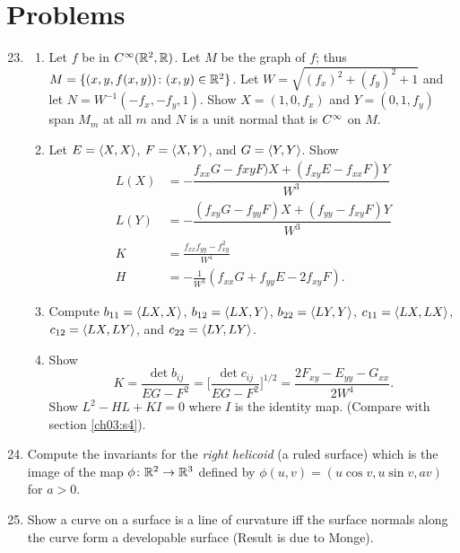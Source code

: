 \documentclass[../main]{subfiles}
\begin{document}
\section*{Problems}

\begin{enumerate}
    \setcounter{enumi}{22}
    \item\label{pro:23} 
    \begin{enumerate}[label = (\roman*)]
        \item Let $f$ be in $C^\infty(\mathbb{R}^2, \mathbb{R})$. Let $M$ be the graph of $f$; thus \\ $M = \{(x,y,f(x,y)) \colon (x,y) \in \mathbb{R}^2\}$. Let $W = \sqrt{(f_x)^2 + (f_y)^2 + 1}$ and let $N = W^{-1}(-f_x, -f_y, 1)$. Show $X = (1, 0, f_x)$ and $Y = (0, 1, f_y)$ span $M_m$ at all $m$ and $N$ is a unit normal that is $C^\infty$ on $M$.
        \item Let $E = \left\langle X,X\right\rangle$, $F=\left\langle X,Y\right\rangle$, and $G = \left\langle Y,Y\right\rangle$. Show
    \[ 
    \begin{aligned}
    L(X) &= -\dfrac{f_{xx}G-f{xy}F)X + (f_{xy}E - f_{xx}F)Y}{W^3}\\
    L(Y) &= -\dfrac{(f_{xy}G-f_{yy}F)X+(f_{yy}-f_{xy}F)Y}{W^3}\\
    K &= \frac{f_{xx}f_{yy} - f_{xy}^2}{W^4}\\
    H &= -\frac{1}{W^3} (f_{xx}G + f_{yy}E - 2f_{xy}F).
    \end{aligned}
    \]
        \item Compute $b_{11} = \left\langle LX,X\right\rangle$, $b_{12}=\left\langle LX,Y\right\rangle$, $b_{22} = \left\langle LY,Y\right\rangle$, $c_{11}=\left\langle LX,LX\right\rangle$, $c_{12}=\left\langle LX,LY\right\rangle$, and $c_{22}=\left\langle LY,LY\right\rangle$.
        \item  Show \[K = \dfrac{\det b_{ij}}{EG-F^2} = \bigg[\dfrac{\det c_{ij}}{EG-F^2}\bigg]^{1/2} = \dfrac{2F_{xy} -E_{yy} - G_{xx}}{2W^4}.\]Show $L^2 - HL + KI = 0$ where $I$ is the identity map. (Compare with section \ref{ch03:s4}). 
    \end{enumerate}
     
    
    
    
    \item\label{pro:24} Compute the invariants for the \emph{right helicoid} (a ruled surface) which is the image of the map $\phi\colon\mathbb{R}^2\to\mathbb{R}^3$ defined by $\phi(u,v) = (u\cos v,u\sin v, av)$ for $a>0$. 
    
    \item\label{pro:25} Show a curve on a surface is a line of curvature iff the surface normals along the curve form a developable surface (Result is due to Monge).
\end{enumerate}
\end{document}
